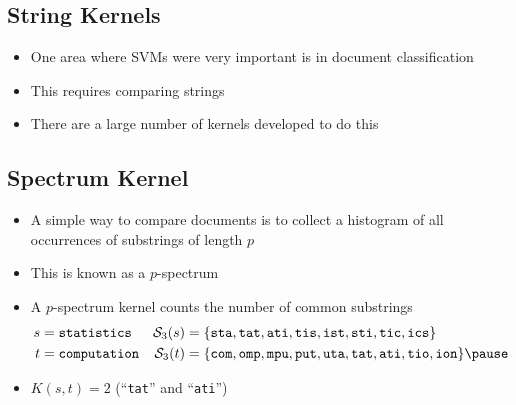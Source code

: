 
\begin{slide}
\section{String Kernels}

\begin{PauseHighLight}
  \begin{itemize}
  \item One area where SVMs were very important is in document
    classification\pause
  \item This requires comparing strings\pause
  \item There are a large number of kernels developed to do this\pause
  \end{itemize}
\end{PauseHighLight}

\end{slide}


\begin{slide}
\section[-1]{Spectrum Kernel}

\begin{PauseHighLight}
  \begin{itemize}
  \item A simple way to compare documents is to collect a histogram of
    all occurrences of substrings of length $p$\pause
  \item This is known as a $p$-spectrum\pause
  \item A $p$-spectrum kernel counts the number of common substrings
    {\small
    \begin{align*}
      s &= \mbox{\tt statistics} & \mathcal{S}_3(s) &= \{\mathtt{sta, tat, ati, tis,
      ist, sti, tic, ics}\}
      \\
      t &= \mbox{\tt computation} & \mathcal{S}_3(t) &= \{\mathtt{com, omp,
      mpu, put, uta, tat, ati, tio, ion}\}\pause
    \end{align*}}
  \item $K(s,t) = 2$ (``\texttt{tat}'' and ``\texttt{ati}'')\pause
  \end{itemize}
\end{PauseHighLight}

\end{slide}

